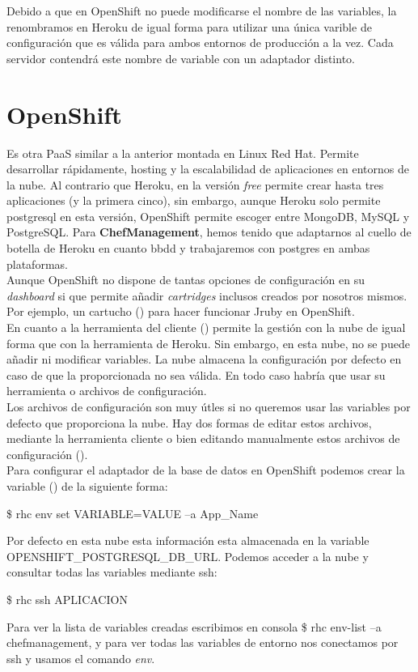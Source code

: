 Debido a que en OpenShift no puede modificarse el nombre de las variables, la renombramos en Heroku de igual forma para utilizar una única varible de configuración que es válida para ambos entornos de producción a la vez. Cada servidor contendrá este nombre de variable con un adaptador distinto.


\vspace*{0.2in}
\section{OpenShift}\label{cap.3.3}
Es otra PaaS similar a la anterior montada en Linux Red Hat. Permite desarrollar rápidamente, hosting y la escalabilidad de aplicaciones en entornos de la nube. Al contrario que Heroku, en la versión \emph{free} permite crear hasta tres aplicaciones (y la primera cinco), sin embargo, aunque Heroku solo permite postgresql en esta versión, OpenShift permite escoger entre MongoDB, MySQL y PostgreSQL. Para \textbf{ChefManagement}, hemos tenido que adaptarnos al cuello de botella de Heroku en cuanto bbdd y trabajaremos con postgres en ambas plataformas. \\

Aunque OpenShift no dispone de tantas opciones de configuración en su \emph{dashboard} si que permite añadir \emph{cartridges} inclusos creados por nosotros mismos. Por ejemplo, un cartucho (\cite{URL:Cartucho_JRuby}) para hacer funcionar Jruby en OpenShift. \\

En cuanto a la herramienta del cliente (\cite{URL:OpenshiftTool}) permite la gestión con la nube de igual forma que con la herramienta de Heroku. Sin embargo, en esta nube, no se puede añadir ni modificar variables. La nube almacena la configuración por defecto en caso de que la proporcionada no sea válida. En todo caso habría que usar su herramienta o archivos de configuración. \\

Los archivos de configuración son muy útles si no queremos usar las variables por defecto que proporciona la nube. Hay dos formas de editar estos archivos, mediante la herramienta cliente o bien editando manualmente estos archivos de configuración (\cite{URL:Openshift_configuracion_archivos}). \\

Para configurar el adaptador de la base de datos en OpenShift podemos crear la variable (\cite{URL:Openshift_vars}) de la siguiente forma:
\begin{center}
	\$ rhc env set VARIABLE=VALUE --a App\_Name
\end{center}

Por defecto en esta nube esta información esta almacenada en la variable OPENSHIFT\_POSTGRESQL\_DB\_URL. Podemos acceder a la nube y consultar todas las variables mediante ssh:
\begin{center}
\$ rhc ssh APLICACION
\end{center}

Para ver la lista de variables creadas escribimos en consola \$ rhc env-list --a chefmanagement, y para ver todas las variables de entorno nos conectamos por ssh y usamos el comando \emph{env}.
